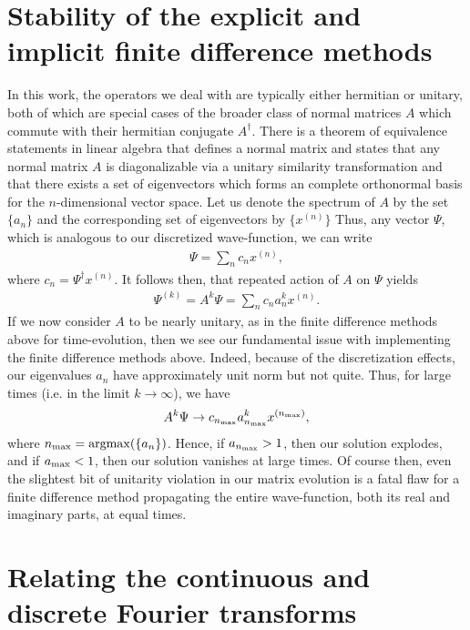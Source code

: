 \section{Stability of the explicit and implicit finite difference methods}
\label{app:stability-of-the-explicity-and-implicit-finite-difference-methods}

In this work, the operators we deal with are typically either hermitian or unitary, both of which are special cases of the broader class of normal matrices $A$ which commute with their hermitian conjugate $A^{\dagger}$.
There is a theorem of equivalence statements in linear algebra that defines a normal matrix and states that any normal matrix $A$ is diagonalizable via a unitary similarity transformation and that there exists a set of eigenvectors which forms an complete orthonormal basis for the $n$-dimensional vector space.
Let us denote the spectrum of $A$ by the set $\{ a_{n} \}$ and the corresponding set of eigenvectors by $\{ x^{(n)} \}$
Thus, any vector $\Psi$, which is analogous to our discretized wave-function, we can write
\begin{align}
    \Psi = \sum_{n} c_{n} x^{(n)}
,\end{align}
where $c_{n} = \Psi^{\dagger} x^{(n)}$.
It follows then, that repeated action of $A$ on $\Psi$ yields
\begin{align}
    \Psi^{(k)} = A^{k} \Psi = \sum_{n} c_{n} a_{n}^{k} x^{(n)}
.\end{align}
If we now consider $A$ to be nearly unitary, as in the finite difference methods above for time-evolution, then we see our fundamental issue with implementing the finite difference methods above.
Indeed, because of the discretization effects, our eigenvalues $a_{n}$ have approximately unit norm but not quite.
Thus, for large times (i.e. in the limit $k \rightarrow \infty$), we have
\begin{align}
    A^{k} \Psi \rightarrow c_{n_{\rm max}} a_{n_{\rm max}}^{k} x^{(n_{\rm max})}
,\end{align}
where $n_{\rm max} = {\rm argmax}(\{ a_{n} \})$.
Hence, if $a_{n_{\rm max}} > 1$, then our solution explodes, and if $a_{\rm max} < 1$, then our solution vanishes at large times.
Of course then, even the slightest bit of unitarity violation in our matrix evolution is a fatal flaw for a finite difference method propagating the entire wave-function, both its real and imaginary parts, at equal times.

\section{Relating the continuous and discrete Fourier transforms}
\label{app:relating-the-continuous-and-discrete-fourier-transforms}

